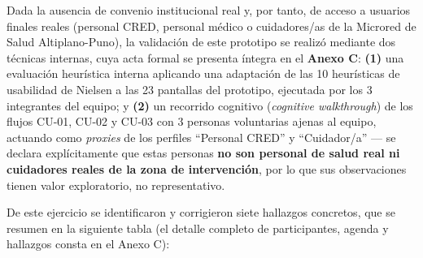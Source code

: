 \documentclass[11pt,a4paper]{article}
\begin{document}
Dada la ausencia de convenio institucional real y, por tanto, de acceso a usuarios finales reales (personal CRED, personal médico o cuidadores/as de la Microred de Salud Altiplano-Puno), la validación de este prototipo se realizó mediante dos técnicas internas, cuya acta formal se presenta íntegra en el \textbf{Anexo C}: \textbf{(1)} una evaluación heurística interna aplicando una adaptación de las 10 heurísticas de usabilidad de Nielsen a las 23 pantallas del prototipo, ejecutada por los 3 integrantes del equipo; y \textbf{(2)} un recorrido cognitivo (\emph{cognitive walkthrough}) de los flujos CU-01, CU-02 y CU-03 con 3 personas voluntarias ajenas al equipo, actuando como \emph{proxies} de los perfiles ``Personal CRED'' y ``Cuidador/a'' --- se declara explícitamente que estas personas \textbf{no son personal de salud real ni cuidadores reales de la zona de intervención}, por lo que sus observaciones tienen valor exploratorio, no representativo.

De este ejercicio se identificaron y corrigieron siete hallazgos concretos, que se resumen en la siguiente tabla (el detalle completo de participantes, agenda y hallazgos consta en el Anexo C):
\end{document}
